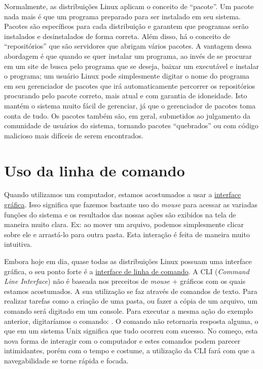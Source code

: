 \documentclass{handout_utfpr}
\newcommand{\com}[1]{
\colorbox{light-gray}{\texttt{\pbox{\textwidth}{\$ #1}}}
}
\begin{document}
Normalmente, as distribuições Linux aplicam o conceito de ``pacote''. Um pacote nada mais é que um programa preparado para ser instalado em seu sistema. Pacotes são específicos para cada distribuição e garantem que programas serão instalados e desinstalados de forma correta. Além disso, há o conceito de ``repositórios'' que são servidores que abrigam vários pacotes. A vantagem dessa abordagem é que quando se quer instalar um programa, ao invés de se procurar em um site de busca pelo programa que se deseja, baixar um executável e instalar o programa; um usuário Linux pode simplesmente digitar o nome do programa em seu gerenciador de pacotes que irá automaticamente percorrer os repositórios procurando pelo pacote correto, mais atual e com garantia de idoneidade. Isto mantém o sistema muito fácil de gerenciar, já que o gerenciador de pacotes toma conta de tudo. Os pacotes também são, em geral, submetidos ao julgamento da comunidade de usuários do sistema, tornando pacotes ``quebrados'' ou com código malicioso mais difíceis de serem encontrados.

\section{Uso da linha de comando}

Quando utilizamos um computador, estamos acostumados a usar a \underline{interface gráfica}. Isso significa que fazemos bastante uso do \textit{mouse} para acessar as variadas funções do sistema e os resultados das nossas ações são exibidos na tela de maneira muito clara. Ex: ao mover um arquivo, podemos simplesmente clicar sobre ele e arrastá-lo para outra pasta. Esta interação é feita de maneira muito intuitiva.

Embora hoje em dia, quase todas as distribuições Linux possuam uma interface gráfica, o seu ponto forte é a \underline{interface de linha de comando}. A CLI (\emph{Command Line Interface}) não é baseada nos preceitos de \textit{mouse} + gráficos com os quais estamos acostumados. A sua utilização se faz através de comandos de texto. Para realizar tarefas como a criação de uma pasta, ou fazer a cópia de um arquivo, um comando será digitado em um console. Para executar a mesma ação do exemplo anterior, digitaríamos o comando: \com{mv local\_arquivo local\_destino}. O comando não retornaria resposta alguma, o que em um sistema Unix significa que tudo ocorreu com sucesso. No começo, esta nova forma de interagir com o computador e estes comandos podem parecer intimidantes, porém com o tempo e costume, a utilização da CLI fará com que a navegabilidade se torne rápida e focada.
\end{document}
